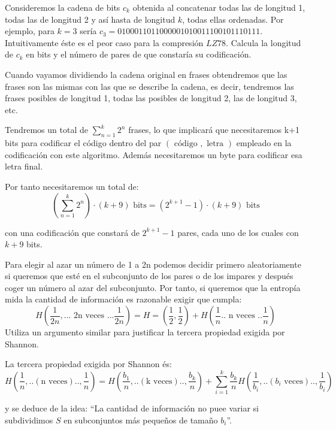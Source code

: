 \begin{problem}[17]
Consideremos la cadena de bits $c_k$ obtenida al concatenar todas las de longitud 1, todas las de longitud 2 y así hasta de longitud $k$, todas ellas ordenadas. Por ejemplo, para $k=3$ sería $c_3=0100011011000001010011100101110111$. Intuitivamente éste es el peor caso para la compresión $LZ78$. Calcula la longitud de $c_k$ en bits y el número de pares de que constaría su codificación.
\solution

\yoP

Cuando vayamos dividiendo la cadena original en frases obtendremos que las frases son las mismas con las que se describe la cadena, es decir, tendremos las frases posibles de longitud 1, todas las posibles de longitud 2, las de longitud 3, etc.

Tendremos un total de $\sum_{n=1}^k 2^n$ frases, lo que implicará que necesitaremos k+1 bits para codificar el código dentro del par $(\text{ código }, \text{ letra })$ empleado en la codificación con este algoritmo. Además necesitaremos un byte para codificar esa letra final.

Por tanto necesitaremos un total de:
\[\left(\sum_{n=1}^k 2^n\right)\cdot (k+9) \text{ bits} = (2^{k+1}-1)\cdot (k+9) \text{ bits}\]

con una codificación que constará de $2^{k+1} -1 $ pares, cada uno de los cuales con $k+9$ bits.

\end{problem}

\begin{problem}[18]
Para elegir al azar un número de 1 a 2n podemos decidir primero aleatoriamente si queremos que esté en el subconjunto de los pares o de los impares y después coger un número al azar del subconjunto. Por tanto, si queremos que la entropía mida la cantidad de información es razonable exigir que cumpla:
\[H \left( \frac{1}{2n},... \text{ 2n veces } ... \frac{1}{2n}\right)=H=\left(\frac{1}{2},\frac{1}{2}\right)+H \left(\frac{1}{n} .. \text{ n veces }.. \frac{1}{n} \right)\]
Utiliza un argumento similar para justificar la tercera propiedad exigida por Shannon.
\solution

\yoP

La tercera propiedad exigida por Shannon és:
\[H\left(\frac{1}{n},..(\text{n veces})..,\frac{1}{n}\right) =  H\left(\frac{b_1}{n},..(\text{k veces})..,\frac{b_k}{n}\right) + \sum^{k}_{i = 1} \frac{b_k}{n} H\left(\frac{1}{b_i},..(b_i \text{ veces})..,\frac{1}{b_i}\right) \]

y se deduce de la idea: ``La cantidad de información no puee variar si subdividimos $S$ en subconjuntos más pequeños de tamaño $b_i$''.
\end{problem}

